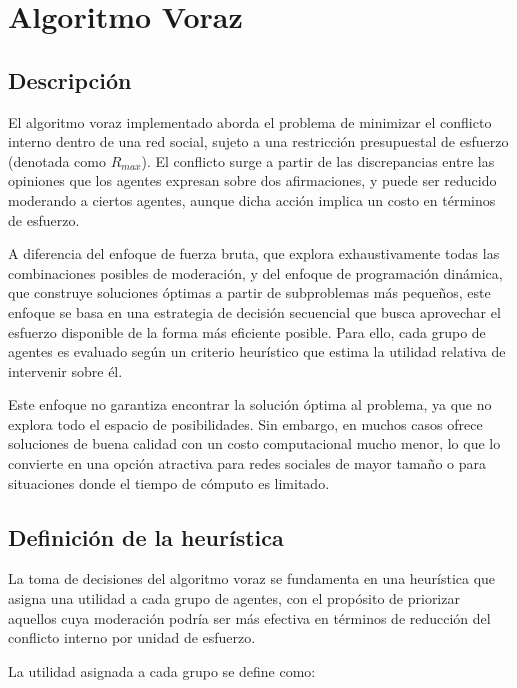 \documentclass[11pt,letter]{article}
\begin{document}

\newpage

\section{Algoritmo Voraz}

\subsection{Descripción}
El algoritmo voraz implementado aborda el problema de minimizar el conflicto interno dentro de una red social, sujeto a una restricción presupuestal de esfuerzo (denotada como $R_{max}$). El conflicto surge a partir de las discrepancias entre las opiniones que los agentes expresan sobre dos afirmaciones, y puede ser reducido moderando a ciertos agentes, aunque dicha acción implica un costo en términos de esfuerzo.

A diferencia del enfoque de fuerza bruta, que explora exhaustivamente todas las combinaciones posibles de moderación, y del enfoque de programación dinámica, que construye soluciones óptimas a partir de subproblemas más pequeños, este enfoque se basa en una estrategia de decisión secuencial que busca aprovechar el esfuerzo disponible de la forma más eficiente posible. Para ello, cada grupo de agentes es evaluado según un criterio heurístico que estima la utilidad relativa de intervenir sobre él.

Este enfoque no garantiza encontrar la solución óptima al problema, ya que no explora todo el espacio de posibilidades. Sin embargo, en muchos casos ofrece soluciones de buena calidad con un costo computacional mucho menor, lo que lo convierte en una opción atractiva para redes sociales de mayor tamaño o para situaciones donde el tiempo de cómputo es limitado.

\subsection{Definición de la heurística}

La toma de decisiones del algoritmo voraz se fundamenta en una heurística que asigna una utilidad a cada grupo de agentes, con el propósito de priorizar aquellos cuya moderación podría ser más efectiva en términos de reducción del conflicto interno por unidad de esfuerzo.

La utilidad asignada a cada grupo se define como:
\end{document}
